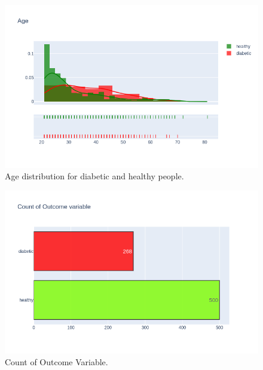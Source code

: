 \documentclass[12pt]{article}
\begin{document}
\begin{figure}[ht]
\centering
\includegraphics[width=1\textwidth]{newplot(9).png}
\caption{Age distribution for diabetic and healthy people.}
\end{figure}

\begin{figure}[ht]
\centering
\includegraphics[width=1\textwidth]{newplot.png}
\caption{Count of Outcome Variable.}
\end{figure}
\clearpage
\newpage
\end{document}
